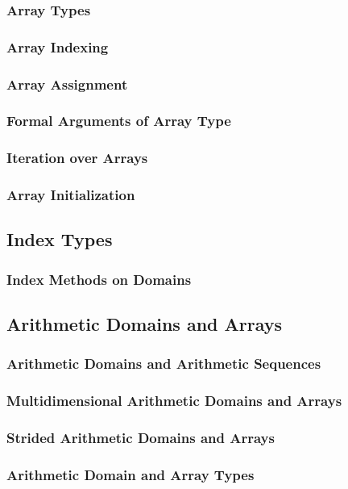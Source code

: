 \documentclass[10pt,twoside,titlepage]{article}
\begin{document}
\subsubsection{Array Types}
\subsubsection{Array Indexing}
\subsubsection{Array Assignment}
\subsubsection{Formal Arguments of Array Type}
\subsubsection{Iteration over Arrays}
\subsubsection{Array Initialization}
\subsection{Index Types}
\subsubsection{Index Methods on Domains}
\subsection{Arithmetic Domains and Arrays}
\subsubsection{Arithmetic Domains and Arithmetic Sequences}
\subsubsection{Multidimensional Arithmetic Domains and Arrays}
\subsubsection{Strided Arithmetic Domains and Arrays}
\subsubsection{Arithmetic Domain and Array Types}
\end{document}
